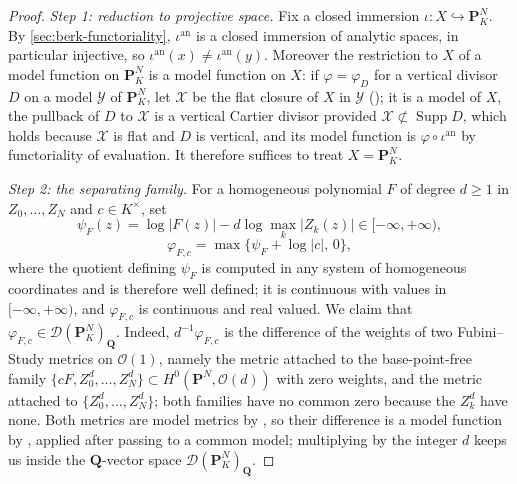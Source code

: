 \begin{proof}
\emph{Step 1: reduction to projective space.} Fix a closed immersion
$\iota:X\hookrightarrow\mathbf P^N_K$. By
\cref{sec:berk-functoriality}, $\iota^{\mathrm{an}}$ is a closed immersion
of analytic spaces, in particular injective, so
$\iota^{\mathrm{an}}(x)\ne\iota^{\mathrm{an}}(y)$. Moreover the
restriction to $X$ of a model function on $\mathbf P^N_K$ is a model
function on $X$: if $\varphi=\varphi_D$ for a vertical divisor $D$ on
a model $\mathcal Y$ of $\mathbf P^N_K$, let $\mathcal X$ be the flat
closure of $X$ in $\mathcal Y$ ();
it is a model of $X$, the pullback of $D$ to $\mathcal X$ is a
vertical Cartier divisor provided $\mathcal X\not\subset\operatorname{Supp}
D$, which holds because $\mathcal X$ is flat and $D$ is vertical, and
its model function is $\varphi\circ\iota^{\mathrm{an}}$ by functoriality of
evaluation. It therefore suffices to treat $X=\mathbf P^N_K$.

\emph{Step 2: the separating family.} For a homogeneous polynomial $F$ of
degree $d\ge1$ in $Z_0,\ldots,Z_N$ and $c\in K^\times$, set
\[
 \psi_{F}(z)=\log|F(z)|-d\log\max_k|Z_k(z)|\in[-\infty,+\infty),
\]
\[
 \varphi_{F,c}=\max\bigl\{\psi_F+\log|c|,\,0\bigr\},
\]
where the quotient defining $\psi_F$ is computed in any system of
homogeneous coordinates and is therefore well defined; it is continuous with
values in $[-\infty,+\infty)$, and $\varphi_{F,c}$ is continuous and
real valued. We claim that
$\varphi_{F,c}\in\mathcal D(\mathbf P^N_K)_{\mathbf Q}$. Indeed,
$d^{-1}\varphi_{F,c}$ is the difference of the weights of two
Fubini--Study metrics on $\mathcal O(1)$, namely the metric attached to
the base-point-free family $\{cF,Z_0^d,\ldots,Z_N^d\}\subset
H^0(\mathbf P^N,\mathcal O(d))$ with zero weights, and the metric attached
to $\{Z_0^d,\ldots,Z_N^d\}$; both families have no common zero because
the $Z_k^d$ have none. Both metrics are model metrics by
, so their difference is a model function by
, applied after passing to a common
model; multiplying by the integer $d$ keeps us inside the
$\mathbf Q$-vector space $\mathcal D(\mathbf P^N_K)_{\mathbf Q}$.


\end{proof}
